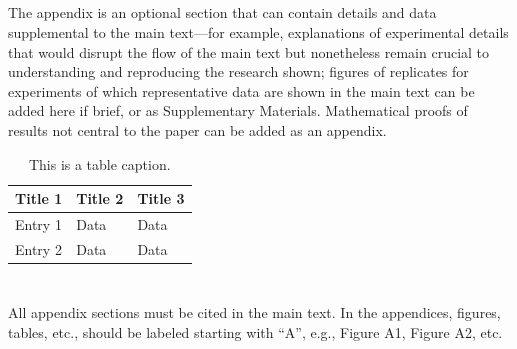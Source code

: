 \documentclass[journal,article,submit,moreauthors]{Definitions/mdpi}
\begin{document}
\subsection[\appendixname~\thesubsection]{}

The appendix is an optional section that can contain details and data supplemental to the main text---for example, explanations of experimental details that would disrupt the flow of the main text but nonetheless remain crucial to understanding and reproducing the research shown; figures of replicates for experiments of which representative data are shown in the main text can be added here if brief, or as Supplementary Materials. Mathematical proofs of results not central to the paper can be added as an appendix.

\begin{table}[H] 
\caption{This is a table caption.\label{tab5}}
\begin{tabularx}{\textwidth}{CCC}
\toprule
\textbf{Title 1}	& \textbf{Title 2}	& \textbf{Title 3}\\
\midrule
Entry 1		& Data			& Data\\
Entry 2		& Data			& Data\\
\bottomrule
\end{tabularx}
\end{table}

\section[\appendixname~\thesection]{}

All appendix sections must be cited in the main text. In the appendices, figures, tables, etc., should be labeled starting with “A”, e.g., Figure A1, Figure A2, etc.
\fi
\end{document}
